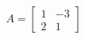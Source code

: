 \documentclass[preview]{standalone}
\begin{document}
\begin{align*}
A = \begin{bmatrix} 1 & -3 \\ 2 & 1 \end{bmatrix}
\end{align*}
\end{document}
